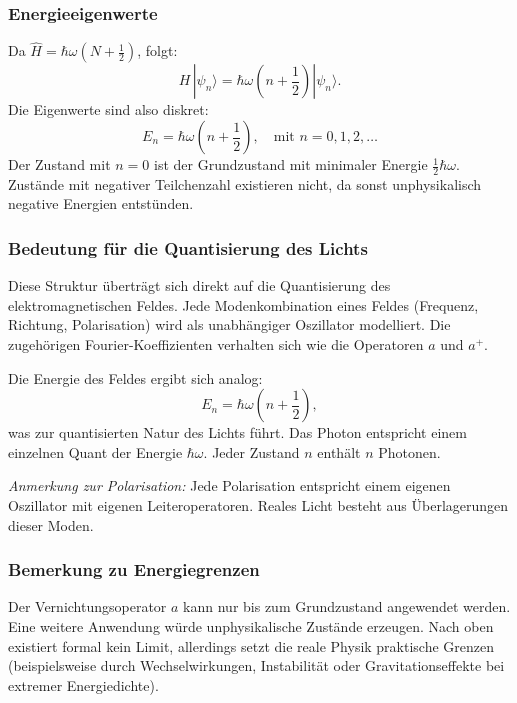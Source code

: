 		\subsubsection{Energieeigenwerte\label{fourier:subsubsection:Energieeigenwerte}}
			Da $\hat{H} = \hbar\omega(N + \frac{1}{2})$, folgt:
			\begin{equation}
				H\,|\psi_n\rangle = \hbar\omega\left(n + \frac{1}{2}\right) |\psi_n\rangle.
			\end{equation}
			Die Eigenwerte sind also diskret:
			\[
				E_n = \hbar\omega\left(n + \frac{1}{2}\right), \quad \text{mit } n = 0,1,2,\dots
			\]
			Der Zustand mit $n = 0$ ist der Grundzustand mit minimaler Energie $\frac{1}{2}\hbar\omega$.
			Zustände mit negativer Teilchenzahl existieren nicht, da sonst unphysikalisch negative Energien entstünden.

		\subsubsection{Bedeutung für die Quantisierung des Lichts\label{fourier:subsubsection:QuantisierungElmagFeld}}
			Diese Struktur überträgt sich direkt auf die Quantisierung des elektromagnetischen Feldes.
			Jede Modenkombination eines Feldes (Frequenz, Richtung, Polarisation) wird als unabhängiger Oszillator modelliert.
			Die zugehörigen Fourier-Koeffizienten verhalten sich wie die Operatoren $a$ und $a^+$.

			Die Energie des Feldes ergibt sich analog:
			\[
				E_n = \hbar\omega\left(n + \frac{1}{2}\right),
			\]
			was zur quantisierten Natur des Lichts  führt.
			Das Photon entspricht einem einzelnen Quant der Energie $\hbar\omega$.
			Jeder Zustand $n$ enthält $n$ Photonen.
			
			\textit{Anmerkung zur Polarisation:}
			Jede Polarisation entspricht einem eigenen Oszillator mit eigenen Leiteroperatoren.
			Reales Licht besteht aus Überlagerungen dieser Moden.

		\subsubsection{Bemerkung zu Energiegrenzen\label{fourier:subsubsection:BemerkungBegrenztheitDerEnergie}}
			Der Vernichtungsoperator $a$ kann nur bis zum Grundzustand angewendet werden.
			Eine weitere Anwendung würde unphysikalische Zustände erzeugen.
			Nach oben existiert formal kein Limit, allerdings setzt die reale Physik praktische Grenzen
			(beispielsweise durch Wechselwirkungen, Instabilität oder Gravitationseffekte bei extremer Energiedichte).

